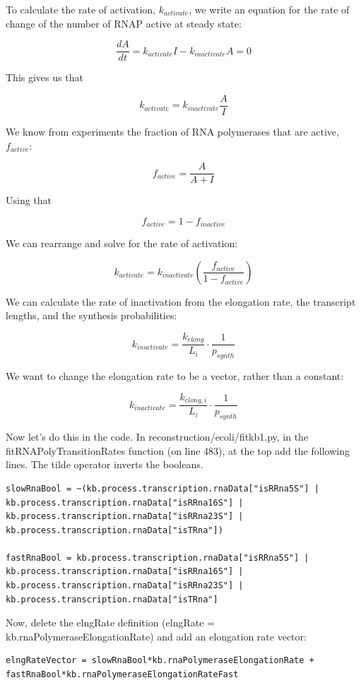 \documentclass[12pt]{article}
\begin{document}
To calculate the rate of activation, $k_{activate}$, we write an equation for the rate of change of the number of RNAP active at steady state:

$$
\frac{dA}{dt}=k_{activate}I - k_{inactivate}A=0
$$

This gives us that

$$
k_{activate} = k_{inactivate}\frac{A}{I}
$$


We know from experiments the fraction of RNA polymerases that are active, $f_{active}$:

$$
f_{active}=\frac{A}{A+I}
$$

Using that 

$$
f_{active} = 1 - f_{inactive}
$$

We can rearrange and solve for the rate of activation:

$$
k_{activate}=k_{inactivate}\left(\frac{f_{active}}{1-f_{active}} \right)
$$

We can calculate the rate of inactivation from the elongation rate, the transcript lengths, and the synthesis probabilities:

$$
k_{inactivate}=\frac{k_{elong}}{L_i}\cdot\frac{1}{p_{synth}}
$$

We want to change the elongation rate to be a vector, rather than a constant:

$$
k_{inactivate}=\frac{k_{elong,i}}{L_i}\cdot \frac{1}{p_{synth}}
$$

Now let’s do this in the code. In reconstruction/ecoli/fitkb1.py, in the fitRNAPolyTransitionRates function (on line 483), at the top add the following lines. The tilde operator inverts the booleans.

\begin{lstlisting}
slowRnaBool = ~(kb.process.transcription.rnaData["isRRna5S"] | kb.process.transcription.rnaData["isRRna16S"] | kb.process.transcription.rnaData["isRRna23S"] | kb.process.transcription.rnaData["isTRna"])

fastRnaBool = kb.process.transcription.rnaData["isRRna5S"] | kb.process.transcription.rnaData["isRRna16S"] | kb.process.transcription.rnaData["isRRna23S"] | kb.process.transcription.rnaData["isTRna"]
\end{lstlisting}

Now, delete the elngRate definition (elngRate = kb.rnaPolymeraseElongationRate) and add an elongation rate vector:

\begin{lstlisting}
elngRateVector = slowRnaBool*kb.rnaPolymeraseElongationRate + fastRnaBool*kb.rnaPolymeraseElongationRateFast
\end{lstlisting}
\end{document}
